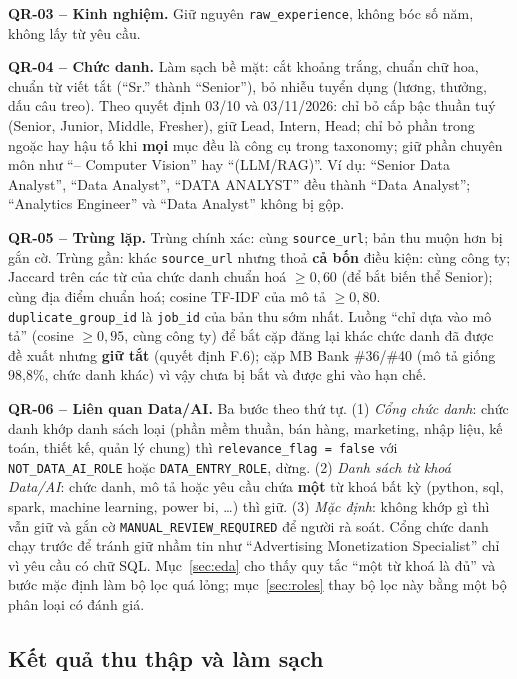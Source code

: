 \documentclass[12pt]{article}
\newcommand{\code}[1]{\texttt{#1}}
\begin{document}
\textbf{QR-03 -- Kinh nghiệm.} Giữ nguyên \code{raw\_experience}, không bóc số năm, không lấy từ yêu cầu.

\textbf{QR-04 -- Chức danh.} Làm sạch bề mặt: cắt khoảng trắng, chuẩn chữ hoa, chuẩn từ viết tắt (``Sr.'' thành ``Senior''), bỏ nhiễu tuyển dụng (lương, thưởng, dấu câu treo). Theo quyết định 03/10 và 03/11/2026: chỉ bỏ cấp bậc thuần tuý (Senior, Junior, Middle, Fresher), giữ Lead, Intern, Head; chỉ bỏ phần trong ngoặc hay hậu tố khi \textbf{mọi} mục đều là công cụ trong taxonomy; giữ phần chuyên môn như ``-- Computer Vision'' hay ``(LLM/RAG)''. Ví dụ: ``Senior Data Analyst'', ``Data Analyst'', ``DATA ANALYST'' đều thành ``Data Analyst''; ``Analytics Engineer'' và ``Data Analyst'' không bị gộp.

\textbf{QR-05 -- Trùng lặp.} Trùng chính xác: cùng \code{source\_url}; bản thu muộn hơn bị gắn cờ. Trùng gần: khác \code{source\_url} nhưng thoả \textbf{cả bốn} điều kiện: cùng công ty; Jaccard trên các từ của chức danh chuẩn hoá $\ge 0{,}60$ (để bắt biến thể Senior); cùng địa điểm chuẩn hoá; cosine TF-IDF của mô tả $\ge 0{,}80$. \code{duplicate\_group\_id} là \code{job\_id} của bản thu sớm nhất. Luồng ``chỉ dựa vào mô tả'' (cosine $\ge 0{,}95$, cùng công ty) để bắt cặp đăng lại khác chức danh đã được đề xuất nhưng \textbf{giữ tắt} (quyết định F.6); cặp MB Bank \#36/\#40 (mô tả giống 98,8\%, chức danh khác) vì vậy chưa bị bắt và được ghi vào hạn chế.

\textbf{QR-06 -- Liên quan Data/AI.} Ba bước theo thứ tự. (1) \textit{Cổng chức danh}: chức danh khớp danh sách loại (phần mềm thuần, bán hàng, marketing, nhập liệu, kế toán, thiết kế, quản lý chung) thì \code{relevance\_flag = false} với \code{NOT\_DATA\_AI\_ROLE} hoặc \code{DATA\_ENTRY\_ROLE}, dừng. (2) \textit{Danh sách từ khoá Data/AI}: chức danh, mô tả hoặc yêu cầu chứa \textbf{một} từ khoá bất kỳ (python, sql, spark, machine learning, power bi, \dots) thì giữ. (3) \textit{Mặc định}: không khớp gì thì vẫn giữ và gắn cờ \code{MANUAL\_REVIEW\_REQUIRED} để người rà soát. Cổng chức danh chạy trước để tránh giữ nhầm tin như ``Advertising Monetization Specialist'' chỉ vì yêu cầu có chữ SQL. Mục~\ref{sec:eda} cho thấy quy tắc ``một từ khoá là đủ'' và bước mặc định làm bộ lọc quá lỏng; mục~\ref{sec:roles} thay bộ lọc này bằng một bộ phân loại có đánh giá.

\subsection{Kết quả thu thập và làm sạch}
\end{document}
